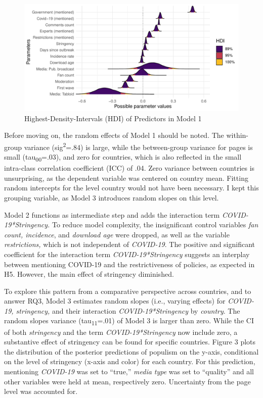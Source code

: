 \documentclass[
]{ccr}
\begin{document}
\begin{figure}

{\centering \includegraphics{plots/hdi_m3b_20240226.pdf}

}

\caption{Highest-Density-Intervals (HDI) of Predictors in Model 1}

\end{figure}

Before moving on, the random effects of Model 1 should be noted. The
within-group variance (sig\textsuperscript{2}=.84) is large, while the
between-group variance for pages is small (tau\textsubscript{00}=.03),
and zero for countries, which is also reflected in the small intra-class
correlation coefficient (ICC) of .04. Zero variance between countries is
unsurprising, as the dependent variable was centered on country mean.
Fitting random intercepts for the level country would not have been
necessary. I kept this grouping variable, as Model 3 introduces random
slopes on this level.

Model 2 functions as intermediate step and adds the interaction term
\emph{COVID-19*Stringency.} To reduce model complexity, the
insignificant control variables \emph{fan count, incidence}, and
\emph{download age} were dropped, as well as the variable
\emph{restrictions,} which is not independent of \emph{COVID-19}. The
positive and significant coefficient for the interaction term
\emph{COVID-19*Stringency} suggests an interplay between mentioning
COVID-19 and the restrictiveness of policies, as expected in H5.
However, the main effect of stringency diminished.

To explore this pattern from a comparative perspective across countries,
and to answer RQ3, Model 3 estimates random slopes (i.e., varying
effects) for \emph{COVID-19, stringency,} and their interaction
\emph{COVID-19*Stringency} by \emph{country}. The random slopes variance
(tau\textsubscript{11}=.01) of Model 3 is larger than zero. While the CI
of both \emph{stringency} and the term \emph{COVID-19*Stringency} now
include zero, a substantive effect of stringency can be found for
specific countries. Figure 3 plots the distribution of the posterior
predictions of populism on the y-axis, conditional on the level of
stringency (x-axis and color) for each country. For this prediction,
mentioning \emph{COVID-19} was set to ``true,'' \emph{media type} was
set to ``quality'' and all other variables were held at mean,
respectively zero. Uncertainty from the page level was accounted for.
\end{document}
